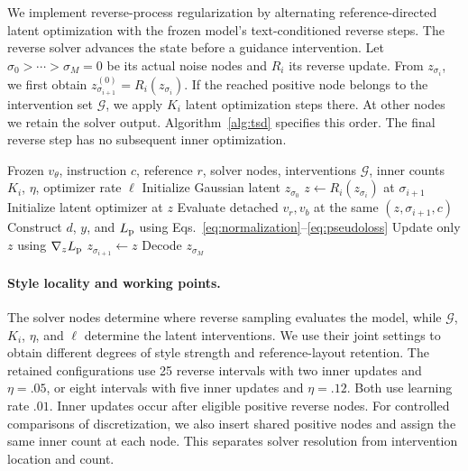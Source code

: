 We implement reverse-process regularization by alternating reference-directed
latent optimization with the frozen model's text-conditioned reverse steps.
The reverse solver advances the state before a guidance intervention. Let
$\sigma_0>\cdots>\sigma_M=0$ be its actual noise nodes and $R_i$ its reverse
update. From $z_{\sigma_i}$, we first obtain
$z^{(0)}_{\sigma_{i+1}}=R_i(z_{\sigma_i})$. If the reached positive node
belongs to the intervention set $\mathcal G$, we apply $K_i$ latent
optimization steps there. At other nodes we retain the solver output.
Algorithm~\ref{alg:tsd} specifies this order. The final reverse step has no
subsequent inner optimization.

\begin{algorithm}[t]
\caption{TSD inference}
\label{alg:tsd}
\begin{algorithmic}[1]
\REQUIRE Frozen $v_\theta$, instruction $c$, reference $r$, solver nodes,
interventions $\mathcal G$, inner counts $K_i$, $\eta$, optimizer rate $\ell$
\STATE Initialize Gaussian latent $z_{\sigma_0}$
\STATE $z\gets R_i(z_{\sigma_i})$ at $\sigma_{i+1}$
\STATE Initialize latent optimizer at $z$
\STATE Evaluate detached $v_r,v_b$ at the same $(z,\sigma_{i+1},c)$
\STATE Construct $d$, $y$, and $L_{\rm p}$ using Eqs.~\ref{eq:normalization}--\ref{eq:pseudoloss}
\STATE Update only $z$ using $\nabla_z L_{\rm p}$
\ENDFOR
\ENDIF
\STATE $z_{\sigma_{i+1}}\gets z$
\ENDFOR
\STATE Decode $z_{\sigma_M}$
\end{algorithmic}
\end{algorithm}

\paragraph{Style locality and working points.}
The solver nodes determine where reverse sampling evaluates the model,
while $\mathcal G$, $K_i$, $\eta$, and $\ell$ determine the latent
interventions. We use their joint settings to obtain different degrees of
style strength and reference-layout retention. The retained configurations
use 25 reverse intervals with two inner updates and $\eta=.05$, or eight
intervals with five inner updates and $\eta=.12$. Both use learning rate
$.01$. Inner updates occur after eligible positive reverse nodes.
For controlled comparisons of discretization, we also insert shared
positive nodes and assign the same inner count at each node. This separates
solver resolution from intervention location and count.

